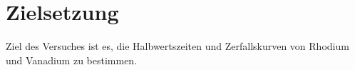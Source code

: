 \section{Zielsetzung}
\label{sec:zielsetzung}

Ziel des Versuches ist es, die Halbwertszeiten und Zerfallskurven von Rhodium und Vanadium zu bestimmen.
